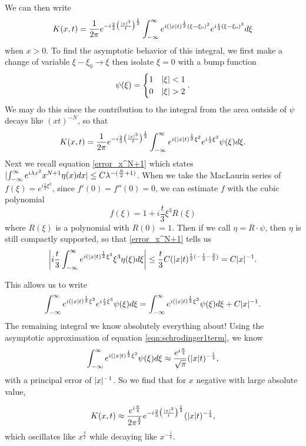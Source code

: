 We can then write
\[
K(x, t) = \frac{1}{2\pi}e^{-i\frac{2}{3}\big(\frac{\lvert x\rvert^3}{t}\big)^\frac{1}{2}}\int_{-\infty}^\infty e^{i(\lvert x\rvert t)^\frac{1}{2}(\xi-\xi_0)^2}e^{i\frac{t}{3}(\xi-\xi_0)^3}d\xi
\]
when $x > 0$. To find the asymptotic behavior of this integral, we first make a change of variable $\xi - \xi_0 \to \xi$ then isolate $\xi = 0$ with a bump function
\[
	\psi(\xi) = \begin{cases}
	1 & \lvert\xi\rvert < 1 \\ 0 & \lvert\xi\rvert > 2
	\end{cases}.
\]
We may do this since the contribution to the integral from the area outside of $\psi$ decays like $(xt)^{-N}$, so that 
\[
	K(x, t) = \frac{1}{2\pi}e^{-i\frac{2}{3}\big(\frac{\lvert x\rvert^3}{t}\big)^\frac{1}{2}} \int_{-\infty}^\infty e^{i(\lvert x\rvert t)^\frac{1}{2}\xi^2}e^{i\frac{t}{3}\xi^3}\psi(\xi)d\xi.
\]
Next we recall equation \ref{error_x^N+1} which states $\lvert\int_{-\infty}^\infty  e^{i\lambda x^2} x^{N+1} \eta(x)dx\rvert \leq C\lambda^{-(\frac{N}{2} + 1)}$.
When we take the MacLaurin series of $f(\xi) = e^{i\frac{t}{3}\xi^3}$, since $f'(0) = f''(0) = 0$, we can estimate $f$ with the cubic polynomial
\[
	f(\xi) = 1 + i\frac{t}{3}\xi^3R(\xi)
\]
where $R(\xi)$ is a polynomial with $R(0) = 1$. Then if we call $\eta = R\cdot\psi$, then $\eta$ is still compactly supported, so that \ref{error_x^N+1} tells us
\[
	\bigg\lvert i\frac{t}{3}\int_{-\infty}^\infty e^{i(\lvert x\rvert t)^\frac{1}{2}\xi^2}\xi^3\eta(\xi)d\xi\bigg\rvert \leq \frac{t}{3}C(\lvert x\rvert t)^{\frac{1}{2}(-\frac{1}{2}-\frac{3}{2})} = C\lvert x\rvert^{-1}.
\]

This allows us to write
\[
	\int_{-\infty}^\infty e^{i(\lvert x\rvert t)^\frac{1}{2}\xi^2}e^{i\frac{t}{3}\xi^3}\psi(\xi)d\xi = \int_{-\infty}^\infty e^{i(\lvert x\rvert t)^\frac{1}{2}\xi^2}\psi(\xi)d\xi + C\lvert x\rvert^{-1}.
\]
The remaining integral we know absolutely everything about! Using the asymptotic approximation of equation \ref{eqn:schrodinger1term}, we know
\[
	\int_{-\infty}^\infty e^{i(\lvert x\rvert t)^\frac{1}{2}\xi^2}\psi(\xi)d\xi \approx \frac{e^{i\frac{\pi}{4}}}{\sqrt{\pi}}(\lvert x\rvert t)^{-\frac{1}{4}},
\]
with a principal error of $\lvert x\rvert^{-1}$. So we find that for $x$ negative with large absolute value, 

\begin{equation}
K(x, t) \approx \frac{e^{i\frac{\pi}{4}}}{2\pi^\frac{3}{2}}e^{-i\frac{2}{3}\big(\frac{\lvert x\rvert^3}{t}\big)^\frac{1}{2}}(\lvert x\rvert t)^{-\frac{1}{4}},
\end{equation}
which oscillates like $x^\frac{3}{2}$ while decaying like $x^{-\frac{1}{4}}$.

